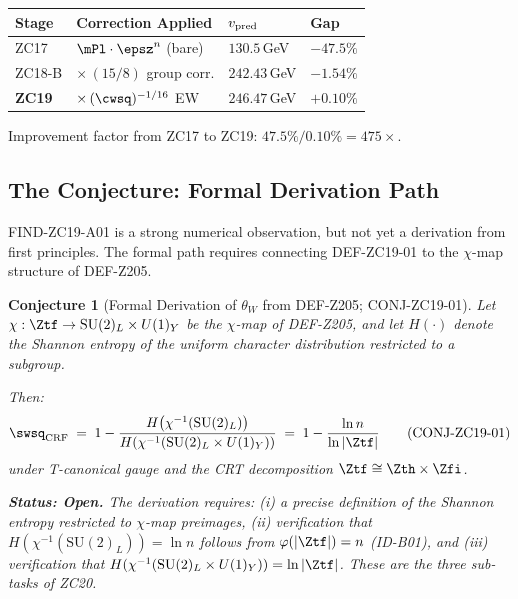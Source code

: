 \documentclass[12pt, a4paper]{article}
\newtheorem{conjecture}{Conjecture}[section]
\begin{document}
\begin{derivedbox}[title={Cumulative Improvement on Higgs VEV Prediction}]
\begin{center}
{\small
\renewcommand{\arraystretch}{1.35}
\begin{tabular}{>{\centering\arraybackslash}p{2.0cm}
                >{\centering\arraybackslash}p{3.5cm}
                >{\centering\arraybackslash}p{3.5cm}
                >{\centering\arraybackslash}p{2.5cm}}
\toprule
\textbf{Stage} & \textbf{Correction Applied} & \textbf{$v_{\rm pred}$} & \textbf{Gap} \\
\midrule
ZC17 & $\mPl\cdot\epsz^n$ (bare) & $130.5$\,GeV & $-47.5\%$ \\
ZC18-B & $\times\,(15/8)$ group corr. & $242.43$\,GeV & $-1.54\%$ \\
\textbf{ZC19} & $\times\,(\cwsq)^{-1/16}$ EW & $\mathbf{246.47}$\,GeV & $\mathbf{+0.10\%}$ \\
\bottomrule
\end{tabular}
}
\end{center}
Improvement factor from ZC17 to ZC19: $47.5\%/0.10\% = 475\times$.
\end{derivedbox}

\subsection{The Conjecture: Formal Derivation Path}
\label{zc19:sec:conjecture}

FIND-ZC19-A01 is a strong numerical observation, but not yet a
derivation from first principles.
The formal path requires connecting DEF-ZC19-01 to the $\chi$-map
structure of DEF-Z205.

\begin{conjecture}[Formal Derivation of $\theta_W$ from DEF-Z205;
  CONJ-ZC19-01]
\label{zc19:conj:formal}
Let $\chi: \Ztf \to \mathrm{SU}(2)_L\times U(1)_Y$ be the
$\chi$-map of DEF-Z205, and let $H(\cdot)$ denote the Shannon
entropy of the uniform character distribution restricted to
a subgroup.

Then:
\begin{equation}
  \swsq_{\rm CRF}
  \;=\; 1 - \frac{H\!\left(\chi^{-1}(\mathrm{SU}(2)_L)\right)}
                  {H\!\left(\chi^{-1}(\mathrm{SU}(2)_L\times U(1)_Y)
                  \right)}
  \;=\; 1 - \frac{\ln n}{\ln|\Ztf|}
  \tag{CONJ-ZC19-01}
\end{equation}
under T-canonical gauge and the CRT decomposition
$\Ztf \cong \Zth\times\Zfi$.

\textbf{Status: Open.}
The derivation requires: (i) a precise definition of the Shannon
entropy restricted to $\chi$-map preimages, (ii) verification that
$H(\chi^{-1}(\mathrm{SU}(2)_L)) = \ln n$ follows from
$\varphi(|\Ztf|) = n$ (ID-B01), and (iii) verification that
$H(\chi^{-1}(\mathrm{SU}(2)_L\times U(1)_Y)) = \ln|\Ztf|$.
These are the three sub-tasks of ZC20.
\end{conjecture}
\end{document}
